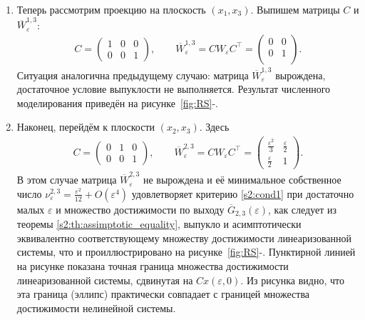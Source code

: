 \documentclass[../main.tex]{subfiles}
\begin{document}
\begin{enumerate}
 
 \item Теперь рассмотрим проекцию на плоскость $ (x_1, x_3) $. 
Выпишем матрицы $ C $ и $ \overline{W}_{\varepsilon}^{1,3} $:
 \begin{gather*}
 C = \begin{pmatrix}
 1 & 0 & 0 \\
 0 & 0 & 1
 \end{pmatrix}, \qquad
 \overline{W}_{\varepsilon}^{1,3} = C W_{\varepsilon} C^{\top} =\begin{pmatrix}
 0 & 0 \\
 0 & 1 \\
 \end{pmatrix} .
 \end{gather*}
 Ситуация аналогична предыдущему случаю: матрица $ \overline{W}_{\varepsilon}^{1,3} $ вырождена, достаточное условие выпуклости не выполняется. 
Результат численного моделирования приведён на рисунке~\ref{fig:RS}-.
 \item Наконец, перейдём к плоскости $ (x_2, x_3) $. 
Здесь
 \begin{gather*}
 C = \begin{pmatrix}
 0 & 1 & 0 \\
 0 & 0 & 1
 \end{pmatrix}, \qquad \overline{W}_{\varepsilon}^{2,3} = C W_{\varepsilon} C^{\top} =\begin{pmatrix}
 \frac{\varepsilon^2}{3} & \frac{\varepsilon}{2} \\
 \frac{\varepsilon}{2} & 1
 \end{pmatrix}.
 \end{gather*}
 В этом случае матрица $ \overline{W}_{\varepsilon}^{2,3} $ не вырождена и её минимальное собственное число $ \nu^{2,3}_{\varepsilon} = \frac{\varepsilon^2}{12} + O(\varepsilon^4) $ удовлетворяет критерию \eqref{s2:cond1} при достаточно малых $ \varepsilon $ и множество достижимости по выходу $ \overline{G}_{2,3}(\varepsilon) $, как следует из теоремы \ref{s2:th:assimptotic_equality}, выпукло и асимптотически эквивалентно соответствующему множеству достижимости линеаризованной системы, что и проиллюстрировано на рисунке~\ref{fig:RS}-. 
Пунктирной линией на рисунке показана точная граница множества достижимости линеаризованной системы, сдвинутая на $ Cx(\varepsilon, 0) $. Из рисунка видно, что эта граница (эллипс) практически совпадает с границей множества достижимости нелинейной системы.
 \end{enumerate} 
 
\end{document}

